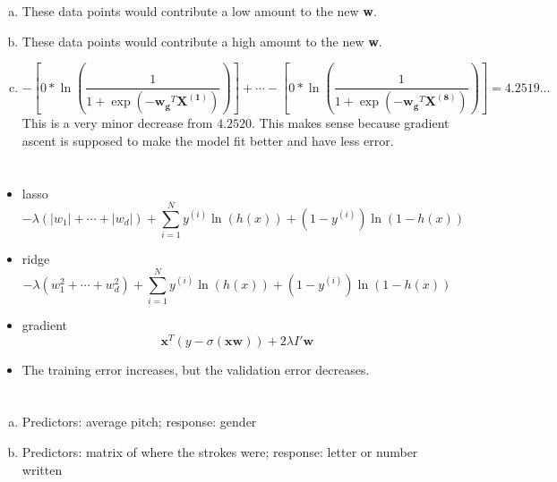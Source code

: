 \documentclass[12pt]{article}
\begin{document}
\begin{enumerate}[(a)]
	\item These data points would contribute a low amount to the new \textbf{w}.
	
	\item These data points would contribute a high amount to the new \textbf{w}.
	
	\item \[-\left[0*\ln{(\dfrac{1}{1+\exp{(-\mathbf{w_g}^T\mathbf{X^{(1)}})}})}\right] + \cdots - \left[0*\ln{(\dfrac{1}{1+\exp{(-\mathbf{w_g}^T\mathbf{X^{(8)}})}})}\right] = 4.2519\ldots\]
	This is a very minor decrease from $ 4.2520 $. This makes sense because gradient ascent is supposed to make the model fit better and have less error.
\end{enumerate}
\newpage

\section{}
\begin{itemize}
	\item lasso \[ -\lambda\left(|w_1| + \cdots + |w_d|\right) + \sum\limits_{i=1}^{N} y^{(i)} \ln{(h(x))} + (1-y^{(i)})\ln{(1-h(x))} \]
	
	\item ridge \[ -\lambda\left(w_1^2 + \cdots + w_d^2\right) + \sum\limits_{i=1}^{N} y^{(i)} \ln{(h(x))} + (1-y^{(i)})\ln{(1-h(x))} \]
	
	\item gradient \[\textbf{x}^T(y-\sigma{(\textbf{x}\mathbf{w})}) + 2 \lambda I' \mathbf{w}\]
	
	\item The training error increases, but the validation error decreases.
\end{itemize}
\newpage

\section{}
\begin{enumerate}[(a)]
	\item Predictors: average pitch; response: gender
	
	\item Predictors: matrix of where the strokes were; response: letter or number written
\end{enumerate}
\newpage
\end{document}
